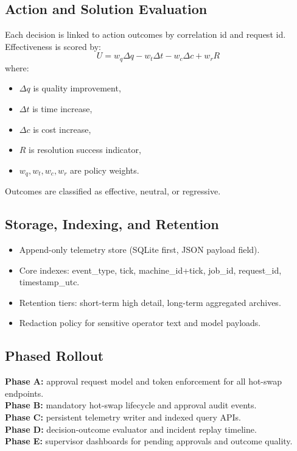 \documentclass{article}
\begin{document}
\subsection{Action and Solution Evaluation}
Each decision is linked to action outcomes by correlation id and request id. Effectiveness is scored by:
\[
U = w_q \Delta q - w_t \Delta t - w_c \Delta c + w_r R
\]
where:
\begin{itemize}
\item $\Delta q$ is quality improvement,
\item $\Delta t$ is time increase,
\item $\Delta c$ is cost increase,
\item $R$ is resolution success indicator,
\item $w_q, w_t, w_c, w_r$ are policy weights.
\end{itemize}
Outcomes are classified as effective, neutral, or regressive.

\subsection{Storage, Indexing, and Retention}
\begin{itemize}
\item Append-only telemetry store (SQLite first, JSON payload field).
\item Core indexes: event\_type, tick, machine\_id+tick, job\_id, request\_id, timestamp\_utc.
\item Retention tiers: short-term high detail, long-term aggregated archives.
\item Redaction policy for sensitive operator text and model payloads.
\end{itemize}

\subsection{Phased Rollout}
\textbf{Phase A:} approval request model and token enforcement for all hot-swap endpoints. \\
\textbf{Phase B:} mandatory hot-swap lifecycle and approval audit events. \\
\textbf{Phase C:} persistent telemetry writer and indexed query APIs. \\
\textbf{Phase D:} decision-outcome evaluator and incident replay timeline. \\
\textbf{Phase E:} supervisor dashboards for pending approvals and outcome quality.
\end{document}

